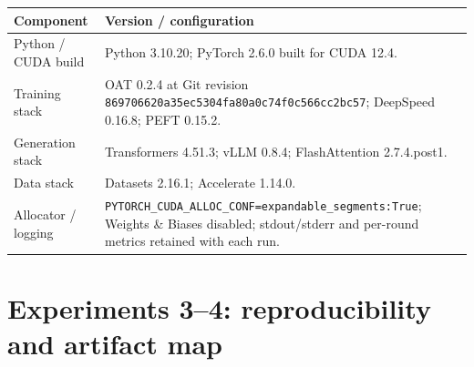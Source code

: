 \begin{center}
\begin{minipage}{\linewidth}
\centering
{}
\label{tab:exp3-runtime}
\scriptsize
\setlength{\tabcolsep}{3pt}
\begin{tabular}{p{.29\linewidth}p{.66\linewidth}}
\toprule
\textbf{Component} & \textbf{Version / configuration} \\
\midrule
Python / CUDA build & Python 3.10.20; PyTorch 2.6.0 built for CUDA 12.4. \\
Training stack & OAT 0.2.4 at Git revision
\texttt{869706620a35ec5304fa80a0\allowbreak{}c74f0c566cc2bc57}; DeepSpeed 0.16.8; PEFT 0.15.2. \\
Generation stack & Transformers 4.51.3; vLLM 0.8.4; FlashAttention 2.7.4.post1. \\
Data stack & Datasets 2.16.1; Accelerate 1.14.0. \\
Allocator / logging & \texttt{PYTORCH\_CUDA\_ALLOC\_CONF=expandable\_segments:True};
Weights \& Biases disabled; stdout/stderr and per-round metrics retained with each
run. \\
\bottomrule
\end{tabular}
\end{minipage}
\end{center}

\section{Experiments 3--4: reproducibility and artifact map}
\label{app:exp3-repro}

